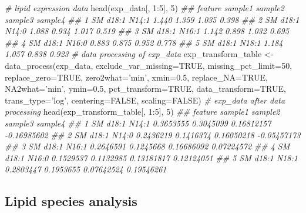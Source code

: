 \documentclass[]{article}
\newcommand{\hlnum}[1]{\textcolor[rgb]{0.816,0.125,0.439}{#1}}%
\newcommand{\hlstr}[1]{\textcolor[rgb]{0.251,0.627,0.251}{#1}}%
\newcommand{\hlcom}[1]{\textcolor[rgb]{0.502,0.502,0.502}{\textit{#1}}}%
\newcommand{\hlopt}[1]{\textcolor[rgb]{0,0,0}{#1}}%
\newcommand{\hlstd}[1]{\textcolor[rgb]{0.251,0.251,0.251}{#1}}%
\newcommand{\hlkwc}[1]{\textcolor[rgb]{0.251,0.251,0.251}{#1}}%
\newcommand{\hlkwd}[1]{\textcolor[rgb]{0.878,0.439,0.125}{#1}}%
\newenvironment{Shaded}{\begin{myshaded}}{\end{myshaded}}
\newcommand{\KeywordTok}[1]{\hlkwd{#1}}
\newcommand{\DataTypeTok}[1]{\hlkwc{#1}}
\newcommand{\DecValTok}[1]{\hlnum{#1}}
\newcommand{\FloatTok}[1]{\hlnum{#1}}
\newcommand{\StringTok}[1]{\hlstr{#1}}
\newcommand{\CommentTok}[1]{\hlcom{#1}}
\newcommand{\OtherTok}[1]{{#1}}
\newcommand{\OperatorTok}[1]{\hlopt{#1}}
\newcommand{\NormalTok}[1]{\hlstd{#1}}
\begin{document}
\begin{Shaded}
\begin{Highlighting}[]
\CommentTok{# lipid expression data}
\KeywordTok{head}\NormalTok{(exp_data[, }\DecValTok{1}\OperatorTok{:}\DecValTok{5}\NormalTok{], }\DecValTok{5}\NormalTok{)}
\CommentTok{##          feature sample1 sample2 sample3 sample4}
\CommentTok{## 1 SM d18:1 N14:1   1.440   1.359   1.035   0.398}
\CommentTok{## 2 SM d18:1 N14:0   1.088   0.934   1.017   0.519}
\CommentTok{## 3 SM d18:1 N16:1   1.142   0.898   1.032   0.695}
\CommentTok{## 4 SM d18:1 N16:0   0.883   0.875   0.952   0.778}
\CommentTok{## 5 SM d18:1 N18:1   1.184   1.057   0.838   0.923}
\CommentTok{# data processing of exp_data}
\NormalTok{exp_transform_table <-}\StringTok{ }\KeywordTok{data_process}\NormalTok{(exp_data, }\DataTypeTok{exclude_var_missing=}\OtherTok{TRUE}\NormalTok{,}
                                    \DataTypeTok{missing_pct_limit=}\DecValTok{50}\NormalTok{, }\DataTypeTok{replace_zero=}\OtherTok{TRUE}\NormalTok{,}
                                    \DataTypeTok{zero2what=}\StringTok{'min'}\NormalTok{, }\DataTypeTok{xmin=}\FloatTok{0.5}\NormalTok{, }
                                    \DataTypeTok{replace_NA=}\OtherTok{TRUE}\NormalTok{, }\DataTypeTok{NA2what=}\StringTok{'min'}\NormalTok{, }
                                    \DataTypeTok{ymin=}\FloatTok{0.5}\NormalTok{, }\DataTypeTok{pct_transform=}\OtherTok{TRUE}\NormalTok{,}
                                    \DataTypeTok{data_transform=}\OtherTok{TRUE}\NormalTok{, }\DataTypeTok{trans_type=}\StringTok{'log'}\NormalTok{,}
                                    \DataTypeTok{centering=}\OtherTok{FALSE}\NormalTok{, }\DataTypeTok{scaling=}\OtherTok{FALSE}\NormalTok{)}
\CommentTok{# exp_data after data processing}
\KeywordTok{head}\NormalTok{(exp_transform_table[, }\DecValTok{1}\OperatorTok{:}\DecValTok{5}\NormalTok{], }\DecValTok{5}\NormalTok{)}
\CommentTok{##          feature   sample1   sample2    sample3     sample4}
\CommentTok{## 1 SM d18:1 N14:1 0.3653555 0.3045099 0.16812157 -0.16985602}
\CommentTok{## 2 SM d18:1 N14:0 0.2436219 0.1416374 0.16050218 -0.05457173}
\CommentTok{## 3 SM d18:1 N16:1 0.2646591 0.1245668 0.16686092  0.07224572}
\CommentTok{## 4 SM d18:1 N16:0 0.1529537 0.1132985 0.13181817  0.12124051}
\CommentTok{## 5 SM d18:1 N18:1 0.2803447 0.1953655 0.07642524  0.19546261}
\end{Highlighting}
\end{Shaded}

\hypertarget{lipid-species-analysis-1}{%
\subsection{Lipid species analysis}\label{lipid-species-analysis-1}}
\end{document}
